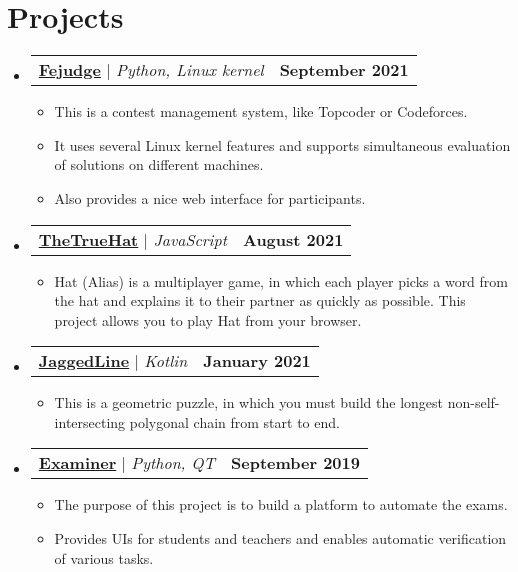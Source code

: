 \documentclass[letterpaper,11pt]{article}
\makeatletter
\newcommand{\resumeItem}[1]{
    \item\small{
        {#1 \vspace{-2pt}}
    }
}
\newcommand{\resumeProjectHeading}[2]{
    \item
    \begin{tabular*}{1.001\textwidth}{l@{\extracolsep{\fill}}r}
        \small#1 & \textbf{\small #2}\\
    \end{tabular*}\vspace{-7pt}
}
\newcommand{\resumeSubHeadingListStart}{\begin{itemize}[leftmargin=0.0in, label={}]}
\newcommand{\resumeSubHeadingListEnd}{\end{itemize}}
\newcommand{\resumeItemListStart}{\begin{itemize}}
\newcommand{\resumeItemListEnd}{\end{itemize}\vspace{-5pt}}
\makeatother
\begin{document}
\section{Projects}
    \vspace{-5pt}
    \resumeSubHeadingListStart
    \resumeProjectHeading
        {\textbf{\href{https://github.com/m20-sch57/Fejudge}{Fejudge}} $|$ \emph{Python, Linux kernel}}{September 2021}
        \resumeItemListStart
            \resumeItem{This is a contest management system, like Topcoder or Codeforces.}
            \resumeItem{It uses several Linux kernel features and supports simultaneous evaluation of solutions on different machines.}
            \resumeItem{Also provides a nice web interface for participants.}
        \resumeItemListEnd
        \vspace{-13pt}
    \resumeProjectHeading
        {\textbf{\href{https://github.com/m20-sch57/thetruehat}{TheTrueHat}} $|$ \emph{JavaScript}}{August 2021}
        \resumeItemListStart
            \resumeItem{Hat (Alias) is a multiplayer game, in which each player picks a word from the hat and explains it to their partner as quickly as possible. This project allows you to play Hat from your browser.}
        \resumeItemListEnd 
        \vspace{-13pt}
    \resumeProjectHeading
        {\textbf{\href{https://github.com/JaggedLine/KotlinLine}{JaggedLine}} $|$ \emph{Kotlin}}{January 2021}
        \resumeItemListStart
            \resumeItem{This is a geometric puzzle, in which you must build the longest non-self-intersecting polygonal chain from start to end.}
        \resumeItemListEnd
        \vspace{-13pt}
    \resumeProjectHeading
        {\textbf{\href{https://github.com/m20-sch57/exam-system}{Examiner}} $|$ \emph{Python, QT}}{September 2019}
        \resumeItemListStart
            \resumeItem{The purpose of this project is to build a platform to automate the exams.}
            \resumeItem{Provides UIs for students and teachers and enables automatic verification of various tasks.}
        \resumeItemListEnd
    \resumeSubHeadingListEnd
\vspace{-15pt}


\end{document}
